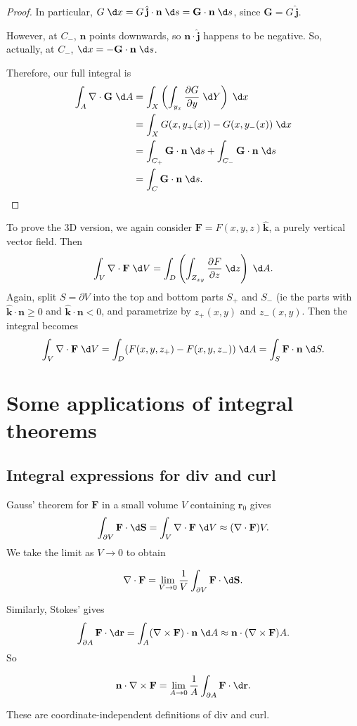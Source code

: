 \documentclass[a4paper]{article}
\begin{document}
\begin{proof}
  In particular, $G\;\d x = G\,\hat{\mathbf{j}}\cdot \mathbf{n}\;\d s = \mathbf{G}\cdot \mathbf{n}\;\d s$, since $\mathbf{G} = G\,\hat{\mathbf{j}}$.

  However, at $C_-$, $\mathbf{n}$ points downwards, so $\mathbf{n}\cdot \hat{\mathbf{j}}$ happens to be negative. So, actually, at $C_-$, $\d x = -\mathbf{G}\cdot \mathbf{n}\;\d s$.

  Therefore, our full integral is
  \begin{align*}
    \int_A \nabla\cdot \mathbf{G}\;\d A &= \int_X \left(\int_{y_x}\frac{\partial G}{\partial y}\;\d Y\right)\;\d x\\
    &= \int_X G(x, y_+(x)) - G(x, y_{-}(x))\;\d x\\
    &= \int_{C_+}\mathbf{G}\cdot \mathbf{n}\;\d s + \int_{C_-}\mathbf{G}\cdot \mathbf{n}\;\d s\\
    &= \int_C \mathbf{G}\cdot \mathbf{n}\;\d s.
  \end{align*}
\end{proof}

To prove the 3D version, we again consider $\mathbf{F} = F(x, y, z)\hat{\mathbf{k}}$, a purely vertical vector field. Then
\[
  \int_V \nabla\cdot \mathbf{F}\;\d V = \int_D \left(\int_{Z_{xy}} \frac{\partial F}{\partial z}\;\d z\right)\;\d A.
\]
Again, split $S = \partial V$ into the top and bottom parts $S_+$ and $S_-$ (ie the parts with $\hat{\mathbf{k}}\cdot \mathbf{n} \geq 0$ and $\hat{\mathbf{k}}\cdot \mathbf{n} < 0$, and parametrize by $z_+(x, y)$ and $z_-(x, y)$. Then the integral becomes
\[
  \int_V \nabla\cdot \mathbf{F}\;\d V = \int_D (F(x, y, z_+) - F(x, y, z_-))\;\d A = \int_S \mathbf{F}\cdot \mathbf{n}\;\d S.
\]
\section{Some applications of integral theorems}
\subsection{Integral expressions for div and curl}
Gauss' theorem for $\mathbf{F}$ in a small volume $V$ containing $\mathbf{r}_0$ gives
\[
  \int_{\partial V}\mathbf{F}\cdot \d \mathbf{S} = \int_V\nabla\cdot \mathbf{F}\;\d V\approx (\nabla\cdot \mathbf{F})V.
\]
We take the limit as $V\to 0$ to obtain
\begin{prop}
  \[
    \nabla \cdot \mathbf{F} = \lim_{V \to 0} \frac{1}{V}\int_{\partial V}\mathbf{F}\cdot \d \mathbf{S}.
  \]
\end{prop}
Similarly, Stokes' gives
\[
  \int _{\partial A}\mathbf{F}\cdot \d \mathbf{r} = \int_A(\nabla\times \mathbf{F})\cdot \mathbf{n}\;\d A \approx \mathbf{n}\cdot (\nabla\times \mathbf{F})A.
\]
So
\begin{prop}
  \[
    \mathbf{n}\cdot \nabla \times \mathbf{F} = \lim_{A \to 0}\frac{1}{A}\int_{\partial A}\mathbf{F}\cdot \d \mathbf{r}.
  \]
\end{prop}
These are coordinate-independent definitions of div and curl.
\end{document}
